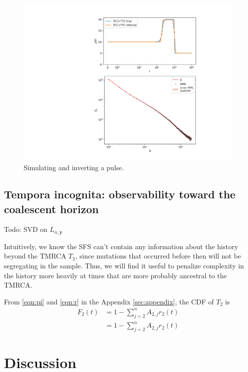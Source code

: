 \documentclass[11pt]{article}
\begin{document}

\begin{figure}
  \centering
  \includegraphics[width=.7\textwidth]{figures/fit_teaser}
  \caption{Simulating and inverting a pulse.}
  \label{}
\end{figure}

\subsection*{Tempora incognita: observability toward the coalescent horizon}\label{sec:model:loss}

Todo: SVD on $L_{n, \boldsymbol y}$

Intuitively, we know the SFS can't contain any information about the history beyond the TMRCA $T_2$, since mutations that occurred before then will not be segregating in the sample.
Thus, we will find it useful to penalize complexity in the history more heavily at times that are more probably ancestral to the TMRCA.

From \eqref{eqn:pi} and \eqref{eqn:r} in the Appendix \ref{sec:appendix}, the CDF of $T_2$ is
\begin{align}
F_2(t) &= 1 - \sum_{j=2}^n A_{2,j}r_2(t)\\
&= 1 - \sum_{j=2}^n A_{2,j}r_2(t)
\end{align}


\section*{Discussion}\label{sec:discussion}
\end{document}
